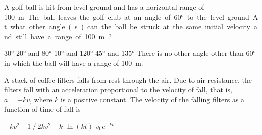 \documentclass{../../oss-apphys-exam}
\begin{document}
\begin{multicols*}{2}
  \begin{questions}
%    
%
    
    \question A golf ball is hit from level ground and has a horizontal range of
    \SI{100}\metre. The ball leaves the golf club at an angle of \ang{60} to
    the level ground. At what other angle(s) can the ball be struck at the same
    initial velocity and still have a range of \SI{100}\metre?
    \begin{choices}
      \choice\ang{30}
      \choice\ang{20} and \ang{80}
      \choice\ang{10} and \ang{120}
      \choice\ang{45} and \ang{135}
      \choice There is no other angle other than \ang{60} in which the ball will
      have a range of \SI{100}\metre.
    \end{choices}

    \question A stack of coffee filters falls from rest through the air. Due to
    air resistance, the filters fall with an acceleration proportional to the
    velocity of fall, that is, $a=-kv$, where $k$ is a positive constant. The
    velocity of the falling filters as a function of time of fall is
    \begin{choices}
      \choice $-kv^2$
      \choice $-1⁄2kv^2$
      \choice $-k$
      \choice $\ln(kt)$
      \choice $v_0e^{-kt}$
    \end{choices}
    

\end{questions}
\end{multicols*}
\end{document}
